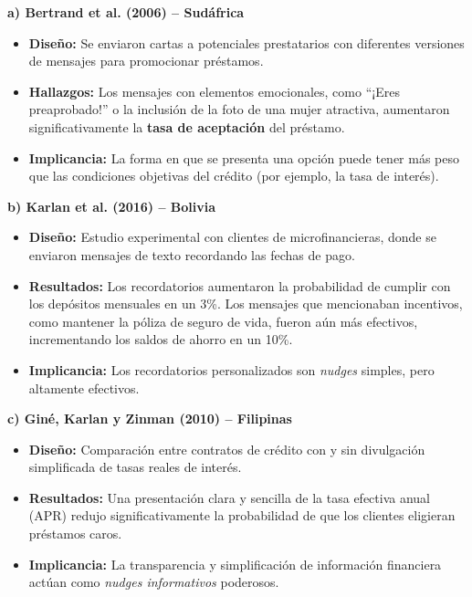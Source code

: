 \documentclass[10pt]{article}
\begin{document}
\begin{multicols}{2}
\textbf{a) Bertrand et al. (2006) – Sudáfrica}

\begin{itemize}
  \item \textbf{Diseño:} Se enviaron cartas a potenciales prestatarios con diferentes versiones de mensajes para promocionar préstamos.
  \item \textbf{Hallazgos:} Los mensajes con elementos emocionales, como ``¡Eres preaprobado!'' o la inclusión de la foto de una mujer atractiva, aumentaron significativamente la \textbf{tasa de aceptación} del préstamo.
  \item \textbf{Implicancia:} La forma en que se presenta una opción puede tener más peso que las condiciones objetivas del crédito (por ejemplo, la tasa de interés).
\end{itemize}

\vspace{0.3cm}

\textbf{b) Karlan et al. (2016) – Bolivia}

\begin{itemize}
  \item \textbf{Diseño:} Estudio experimental con clientes de microfinancieras, donde se enviaron mensajes de texto recordando las fechas de pago.
  \item \textbf{Resultados:} Los recordatorios aumentaron la probabilidad de cumplir con los depósitos mensuales en un 3\%. Los mensajes que mencionaban incentivos, como mantener la póliza de seguro de vida, fueron aún más efectivos, incrementando los saldos de ahorro en un 10\%.
  \item \textbf{Implicancia:} Los recordatorios personalizados son \textit{nudges} simples, pero altamente efectivos.
\end{itemize}

\vspace{0.3cm}

\textbf{c) Giné, Karlan y Zinman (2010) – Filipinas}

\begin{itemize}
  \item \textbf{Diseño:} Comparación entre contratos de crédito con y sin divulgación simplificada de tasas reales de interés.
  \item \textbf{Resultados:} Una presentación clara y sencilla de la tasa efectiva anual (APR) redujo significativamente la probabilidad de que los clientes eligieran préstamos caros.
  \item \textbf{Implicancia:} La transparencia y simplificación de información financiera actúan como \textit{nudges informativos} poderosos.
\end{itemize}


\end{multicols}
\end{document}
